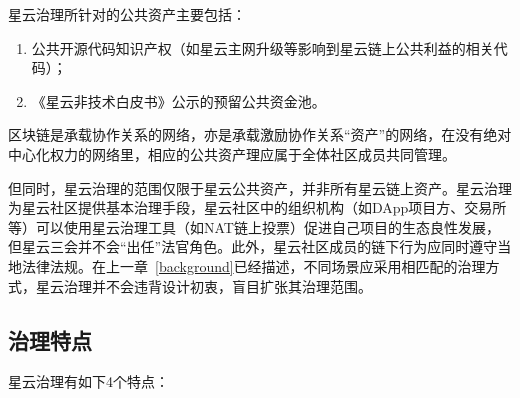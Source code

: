 星云治理所针对的公共资产主要包括：

\begin{enumerate}
	\item 公共开源代码知识产权（如星云主网升级等影响到星云链上公共利益的相关代码）；
	\item 《星云非技术白皮书》公示的预留公共资金池。
\end{enumerate}

区块链是承载协作关系的网络，亦是承载激励协作关系“资产”的网络，在没有绝对中心化权力的网络里，相应的公共资产理应属于全体社区成员共同管理。

但同时，星云治理的范围仅限于星云公共资产，并非所有星云链上资产。星云治理为星云社区提供基本治理手段，星云社区中的组织机构（如DApp项目方、交易所等）可以使用星云治理工具（如NAT链上投票）促进自己项目的生态良性发展，但星云三会并不会“出任”法官角色。此外，星云社区成员的链下行为应同时遵守当地法律法规。在上一章~\ref{background}已经描述，不同场景应采用相匹配的治理方式，星云治理并不会违背设计初衷，盲目扩张其治理范围。

\subsection{治理特点}

星云治理有如下4个特点：

